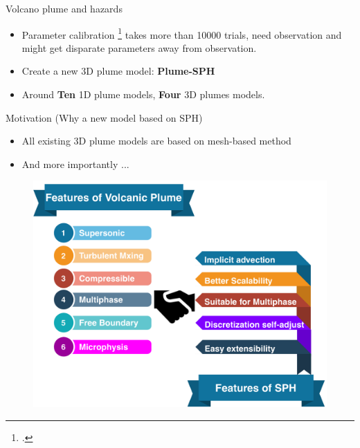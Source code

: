 \documentclass{beamer}
\begin{document}
\begin{frame}{Volcano plume and hazards}
\begin{figure}[!t]
\begin{minipage}{.325\textwidth}
\end{minipage}
\end{figure}
\begin{itemize}
\item Parameter calibration \footcite{fero2009simulating} takes more than 10000 trials, need observation and might get disparate parameters away from observation.
\item Create a new 3D plume model: \textbf{Plume-SPH}
\item Around \textbf{Ten} 1D plume models, \textbf{Four} 3D plumes models.
\end{itemize}

\end{frame}

\begin{frame}{Motivation (Why a new model based on SPH)}
\begin{itemize}
\item All existing 3D plume models are based on mesh-based method
\item And more importantly ...
\end{itemize}

\begin{figure}
\centering
\includegraphics[width=.72\textwidth]{./PPT/Why_SPH}
\end{figure}
\end{frame}
\end{document}
